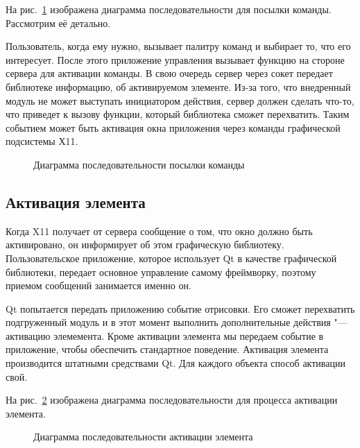 На рис.~\ref{fig:send-command} изображена диаграмма последовательности для
посылки команды. Рассмотрим её детально.

Пользователь, когда ему нужно, вызывает палитру команд и выбирает то, что
его интересует. После этого приложение управления вызывает функцию на стороне
сервера для активации команды. В свою очередь сервер через сокет передает 
библиотеке информацию, об активируемом элементе.
Из-за того, что внедренный модуль не может выступать инициатором действия, 
сервер должен сделать что-то, что приведет к вызову функции, который
библиотека сможет перехватить. Таким событием может быть активация 
окна приложения через команды графической подсистемы Х11.

\begin{figure}[h]
	\centering
	
	\caption{Диаграмма последовательности посылки
		команды}\label{fig:send-command}
\end{figure}

\subsection{Активация элемента}

Когда X11 получает от сервера сообщение о том, что окно должно быть
активировано, он информирует об этом графическую библиотеку. Пользовательское
приложение, которое использует Qt в качестве графической библиотеки,
передает основное управление самому фреймворку, поэтому приемом сообщений
занимается именно он.

Qt попытается передать приложению событие отрисовки. Его сможет перехватить
подгруженный модуль и в этот момент выполнить дополнительные действия "---
активацию элемемента. Кроме активации элемента мы передаем событие в
приложение, чтобы обеспечить стандартное поведение. Активация элемента
производится штатными средствами Qt. Для каждого объекта способ активации
свой.

На рис.~\ref{fig:activate-elem} изображена диаграмма последовательности для
процесса активации элемента.

\begin{figure}[h]
	\centering
	
	\caption{Диаграмма последовательности активации
		элемента}\label{fig:activate-elem}
\end{figure}

